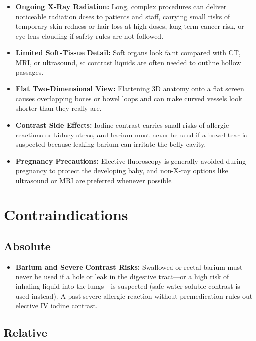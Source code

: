 \begin{itemize}
    \item \textbf{Ongoing X-Ray Radiation:} Long, complex procedures can deliver noticeable radiation doses to patients and staff, carrying small risks of temporary skin redness or hair loss at high doses, long-term cancer risk, or eye-lens clouding if safety rules are not followed.
    \item \textbf{Limited Soft-Tissue Detail:} Soft organs look faint compared with CT, MRI, or ultrasound, so contrast liquids are often needed to outline hollow passages.
    \item \textbf{Flat Two-Dimensional View:} Flattening 3D anatomy onto a flat screen causes overlapping bones or bowel loops and can make curved vessels look shorter than they really are.
    \item \textbf{Contrast Side Effects:} Iodine contrast carries small risks of allergic reactions or kidney stress, and barium must never be used if a bowel tear is suspected because leaking barium can irritate the belly cavity.
    \item \textbf{Pregnancy Precautions:} Elective fluoroscopy is generally avoided during pregnancy to protect the developing baby, and non-X-ray options like ultrasound or MRI are preferred whenever possible.
\end{itemize}

\section{Contraindications}

\subsection{Absolute}

\begin{itemize}
    \item \textbf{Barium and Severe Contrast Risks:} Swallowed or rectal barium must never be used if a hole or leak in the digestive tract---or a high risk of inhaling liquid into the lungs---is suspected (safe water-soluble contrast is used instead). A past severe allergic reaction without premedication rules out elective IV iodine contrast.
\end{itemize}

\subsection{Relative}

